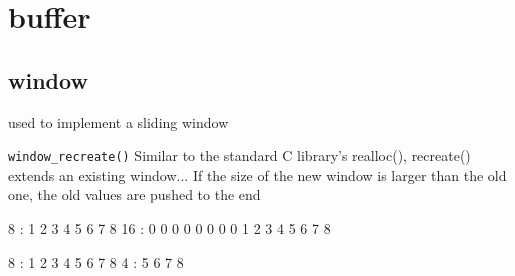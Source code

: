\section{buffer}

\subsection{window}
used to implement a sliding window

{\tt window\_recreate()}
Similar to the standard C library's realloc(), recreate() extends an existing
window...
If the size of the new window is larger than the old one, the old values are
pushed to the end

8   : 1 2 3 4 5 6 7 8
16  : 0 0 0 0 0 0 0 0 1 2 3 4 5 6 7 8

8   : 1 2 3 4 5 6 7 8
4   : 5 6 7 8
